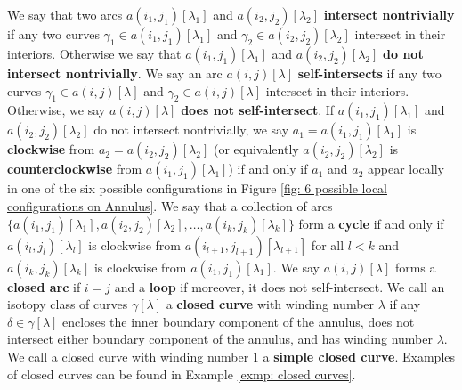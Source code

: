 \documentclass[12pt]{amsart}
\theoremstyle{plain}
\theoremstyle{definition}
\theoremstyle{remark}
\begin{document}
We say that two arcs $a(i_1,j_1)[\lambda_1]$ and $a(i_2,j_2)[\lambda_2]$ \textbf{intersect nontrivially} if any two curves $\gamma_1 \in a(i_{1},j_{1})[\lambda_1]$ and $\gamma_2 \in a(i_2,j_2)[\lambda_2]$ intersect in their interiors. Otherwise we say that $a(i_1,j_1)[\lambda_1]$ and $a(i_2,j_2)[\lambda_2]$ \textbf{do not intersect nontrivially}. We say an arc $a(i,j)[\lambda]$ \textbf{self-intersects} if any two curves $\gamma_1 \in a(i,j)[\lambda]$ and $\gamma_2 \in a(i,j)[\lambda]$ intersect in their interiors. Otherwise, we say $a(i,j)[\lambda]$ \textbf{does not self-intersect}. If $a(i_1,j_1)[\lambda_1]$ and $a(i_2,j_2)[\lambda_2]$ do not intersect nontrivially, we say $a_1 = a(i_1,j_1)[\lambda_1]$ is \textbf{clockwise} from $a_2 = a(i_2,j_2)[\lambda_2]$ (or equivalently $a(i_2,j_2)[\lambda_2]$ is \textbf{counterclockwise} from $a(i_1,j_1)[\lambda_1]$) if and only if $a_1$ and $a_2$ appear locally in one of the six possible configurations in Figure \ref{fig: 6 possible local configurations on Annulus}. We say that a collection of arcs $\{a(i_1,j_1)[\lambda_1], a(i_2,j_2)[\lambda_2], \dots , a(i_k,j_k)[\lambda_k]\}$ form a \textbf{cycle} if and only if $a(i_l,j_l)[\lambda_l]$ is clockwise from $a(i_{l+1},j_{l+1})[\lambda_{l+1}]$ for all $l < k$ and $a(i_k,j_k)[\lambda_k]$ is clockwise from $a(i_1,j_1)[\lambda_1]$. {\color{black} We say $a(i,j)[\lambda]$ forms a \textbf{closed arc} if $i = j$ and a \textbf{loop} if moreover, it does not self-intersect. We call an isotopy class of curves $\gamma[\lambda]$ a \textbf{closed curve} with winding number $\lambda$ if any $\delta\in\gamma[\lambda]$ encloses the inner boundary component of the annulus, does not intersect either boundary component of the annulus, and has winding number $\lambda$. We call a closed curve with winding number 1 a \textbf{simple closed curve}. Examples of closed curves can be found in Example \ref{exmp: closed curves}.} 
\end{document}
